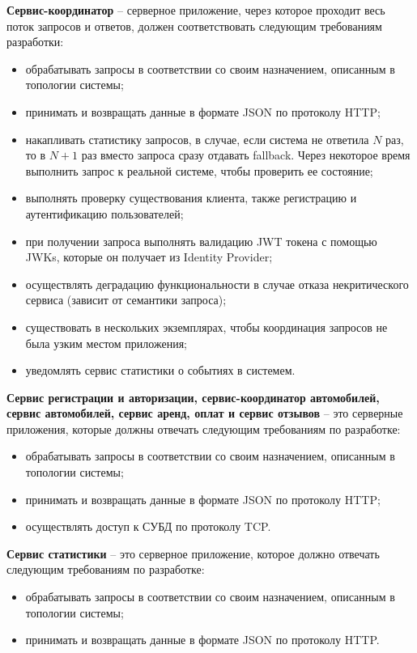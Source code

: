 \textbf{Сервис-координатор} -- серверное приложение, через которое проходит весь поток запросов и ответов, должен соответствовать следующим требованиям разработки:
\begin{itemize}
	\item обрабатывать запросы в соответствии со своим назначением, описанным в топологии системы;
	
	\item принимать и возвращать данные в формате JSON по протоколу HTTP;
	
	\item накапливать статистику запросов, в случае, если система не ответила $N$ раз, то в $N + 1$ раз вместо запроса сразу отдавать fallback. Через некоторое время выполнить запрос к реальной системе, чтобы проверить ее состояние;
	
	\item выполнять проверку существования клиента, также регистрацию и аутентификацию пользователей;
	
	\item при получении запроса выполнять валидацию JWT токена с помощью JWKs, которые он получает из Identity Provider;
	
	\item осуществлять деградацию функциональности в случае отказа некритического сервиса (зависит от семантики запроса);
	
	\item существовать в нескольких экземплярах, чтобы координация запросов не была узким местом приложения;
	
	\item уведомлять сервис статистики о событиях в системем.
\end{itemize}

\textbf{Сервис регистрации и авторизации, сервис-координатор автомобилей, сервис автомобилей, сервис аренд, оплат и сервис отзывов } -- это серверные приложения, которые должны отвечать следующим требованиям по разработке:
\begin{itemize}
	\item обрабатывать запросы в соответствии со своим назначением, описанным в топологии системы;
	
	\item принимать и возвращать данные в формате JSON по протоколу HTTP;
	
	\item осуществлять доступ к СУБД по протоколу TCP.
\end{itemize}

\textbf{Сервис статистики} -- это серверное приложение, которое должно отвечать следующим требованиям по разработке:
\begin{itemize}
	\item обрабатывать запросы в соответствии со своим назначением, описанным в топологии системы;
	
	\item принимать и возвращать данные в формате JSON по протоколу HTTP.
\end{itemize}